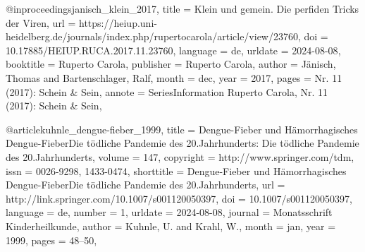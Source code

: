 \documentclass[german,version-2022-01]{uzl-thesis}
\begin{document}
\begin{bibtex-entries}
@inproceedings{janisch_klein_2017,
	title = {Klein und gemein. {Die} perfiden {Tricks} der {Viren}},
	url = {https://heiup.uni-heidelberg.de/journals/index.php/rupertocarola/article/view/23760},
	doi = {10.17885/HEIUP.RUCA.2017.11.23760},
	language = {de},
	urldate = {2024-08-08},
	booktitle = {Ruperto {Carola}},
	publisher = {Ruperto Carola},
	author = {J\"anisch, Thomas and Bartenschlager, Ralf},
	month = dec,
	year = {2017},
	pages = {Nr. 11 (2017): Schein \& Sein},
	annote = {SeriesInformation
Ruperto Carola, Nr. 11 (2017): Schein \& Sein},
}

@article{kuhnle_dengue-fieber_1999,
	title = {Dengue-{Fieber} und {H\"amorrhagisches} {Dengue}-{FieberDie} t\"odliche {Pandemie} des 20.{Jahrhunderts}: {Die} t\"odliche {Pandemie} des 20.{Jahrhunderts}},
	volume = {147},
	copyright = {http://www.springer.com/tdm},
	issn = {0026-9298, 1433-0474},
	shorttitle = {Dengue-{Fieber} und {H\"amorrhagisches} {Dengue}-{FieberDie} t\"odliche {Pandemie} des 20.{Jahrhunderts}},
	url = {http://link.springer.com/10.1007/s001120050397},
	doi = {10.1007/s001120050397},
	language = {de},
	number = {1},
	urldate = {2024-08-08},
	journal = {Monatsschrift Kinderheilkunde},
	author = {Kuhnle, U. and Krahl, W.},
	month = jan,
	year = {1999},
	pages = {48--50},
}


\end{bibtex-entries}



%
%
%
%
\end{document}
